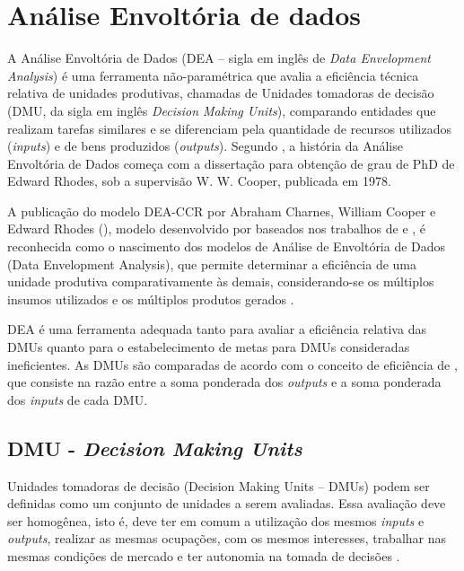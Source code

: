 \section{Análise Envoltória de dados}

A Análise Envoltória de Dados (DEA – sigla em inglês de \textit{Data Envelopment Analysis}) é uma ferramenta
não-paramétrica que avalia a eficiência técnica relativa de unidades produtivas, chamadas de Unidades
tomadoras de decisão (DMU, da sigla em inglês \textit{Decision Making Units}), comparando entidades que realizam tarefas similares e se diferenciam pela quantidade de recursos utilizados (\textit{inputs}) e de bens produzidos (\textit{outputs}). Segundo , a história da Análise Envoltória de Dados começa com a dissertação para obtenção de grau de PhD de Edward Rhodes, sob a supervisão W. W. Cooper, publicada em 1978.

A publicação do modelo DEA-CCR por Abraham Charnes, William Cooper e Edward Rhodes (\citeyear{charnes1978measuring}), modelo desenvolvido por baseados nos trabalhos de  e , é reconhecida como o nascimento dos modelos de Análise de Envoltória de Dados (Data Envelopment Analysis), que permite determinar a eficiência de uma unidade produtiva comparativamente às demais, considerando-se os múltiplos insumos utilizados e os múltiplos produtos gerados .

DEA é uma ferramenta adequada tanto para avaliar a eficiência relativa das DMUs quanto para o estabelecimento de metas para DMUs consideradas ineficientes. As DMUs são comparadas de acordo com o conceito de eficiência de , que consiste na razão entre a soma ponderada dos \textit{outputs} e a soma ponderada dos \textit{inputs} de cada DMU.

\subsection{DMU - \textit{Decision Making Units}}

Unidades tomadoras de decisão (Decision Making Units – DMUs) podem ser definidas como um conjunto de unidades a serem avaliadas. Essa avaliação deve ser homogênea, isto é, deve ter em comum a utilização dos mesmos \textit{inputs} e \textit{outputs}, realizar as mesmas ocupações, com os mesmos interesses, trabalhar nas mesmas condições de mercado e ter autonomia na tomada de decisões .


